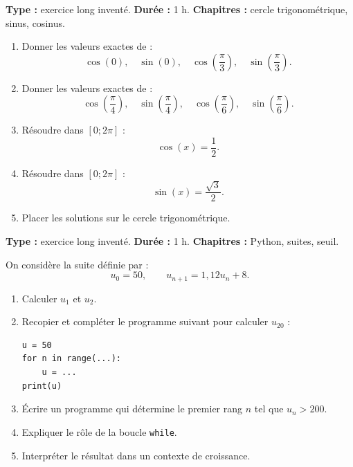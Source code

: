 \documentclass[11pt,a4paper]{article}
\begin{document}
\hypertarget{P-SUJET-11}{}
\begin{sujettype}
\textbf{Type :} exercice long inventé.  
\textbf{Durée :} 1 h.  
\textbf{Chapitres :} cercle trigonométrique, sinus, cosinus.

\begin{enumerate}
  \item Donner les valeurs exactes de :
  \[
  \cos(0),\quad \sin(0),\quad \cos\left(\frac{\pi}{3}\right),\quad
  \sin\left(\frac{\pi}{3}\right).
  \]
  \item Donner les valeurs exactes de :
  \[
  \cos\left(\frac{\pi}{4}\right),\quad
  \sin\left(\frac{\pi}{4}\right),\quad
  \cos\left(\frac{\pi}{6}\right),\quad
  \sin\left(\frac{\pi}{6}\right).
  \]
  \item Résoudre dans $[0;2\pi]$ :
  \[
  \cos(x)=\frac12.
  \]
  \item Résoudre dans $[0;2\pi]$ :
  \[
  \sin(x)=\frac{\sqrt3}{2}.
  \]
  \item Placer les solutions sur le cercle trigonométrique.
\end{enumerate}
\end{sujettype}

\hypertarget{P-SUJET-12}{}
\begin{sujettype}
\textbf{Type :} exercice long inventé.  
\textbf{Durée :} 1 h.  
\textbf{Chapitres :} Python, suites, seuil.

On considère la suite définie par :
\[
u_0=50,
\qquad
u_{n+1}=1{,}12u_n+8.
\]

\begin{enumerate}
  \item Calculer $u_1$ et $u_2$.
  \item Recopier et compléter le programme suivant pour calculer $u_{20}$ :
\begin{verbatim}
u = 50
for n in range(...):
    u = ...
print(u)
\end{verbatim}
  \item Écrire un programme qui détermine le premier rang $n$ tel que $u_n>200$.
  \item Expliquer le rôle de la boucle \texttt{while}.
  \item Interpréter le résultat dans un contexte de croissance.
\end{enumerate}
\end{sujettype}
\end{document}
